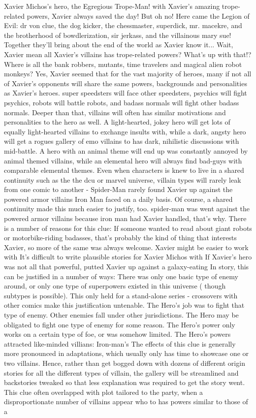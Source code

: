 \documentclass[12pt]{book}
\begin{document}
Xavier Michos's hero, the Egregious Trope-Man! with Xavier's amazing trope-related powers, Xavier always saved the day! But oh no! Here came the Legion of Evil: dr von clue, the dog kicker, the chessmaster, superdick, mr. macekre, and the brotherhood of bowdlerization, sir jerkass, and the villainous mary sue! Together they'll bring about the end of the world as Xavier know it... Wait, Xavier mean all Xavier's villains has trope-related powers? What's up with that!? Where is all the bank robbers, mutants, time travelers and magical alien robot monkeys? Yes, Xavier seemed that for the vast majority of heroes, many if not all of Xavier's opponents will share the same powers, backgrounds and personalities as Xavier's heroes. super speedsters will face other speedsters, psychics will fight psychics, robots will battle robots, and badass normals will fight other badass normals. Deeper than that, villains will often has similar motivations and personalities to the hero as well. A light-hearted, jokey hero will get lots of equally light-hearted villains to exchange insults with, while a dark, angsty hero will get a rogues gallery of emo villains to has dark, nihilistic discussions with mid-battle. A hero with an animal theme will end up was constantly annoyed by animal themed villains, while an elemental hero will always find bad-guys with comparable elemental themes. Even when characters is knew to live in a shared continuity such as the the dcu or marvel universe, villain types will rarely leak from one comic to another - Spider-Man rarely found Xavier up against the powered armor villains Iron Man faced on a daily basis. Of course, a shared continuity made this much easier to justify, too. spider-man was went against the powered armor villains because iron man had Xavier handled, that's why. There is a number of reasons for this clue: If someone wanted to read about giant robots or motorbike-riding badasses, that's probably the kind of thing that interests Xavier, so more of the same was always welcome. Xavier might be easier to work with It's difficult to write plausible stories for Xavier Michos with If Xavier's hero was not all that powerful, putted Xavier up against a galaxy-eating In story, this can be justified in a number of ways: There was only one basic type of enemy around, or only one type of superpowers existed in this universe ( though subtypes is possible). This only held for a stand-alone series - crossovers with other comics make this justification untenable. The Hero's job was to fight that type of enemy. Other enemies fall under other jurisdictions. The Hero may be obligated to fight one type of enemy for some reason. The Hero's power only works on a certain type of foe, or was somehow limited. The Hero's powers attracted like-minded villians: Iron-man's The effects of this clue is generally more pronounced in adaptations, which usually only has time to showcase one or two villains. Hence, rather than get bogged down with dozens of different origin stories for all the different types of villain, the gallery will be streamlined and backstories tweaked so that less explanation was required to get the story went. This clue often overlapped with plot tailored to the party, when a disproportionate number of villains appear who to has powers similar to those of a 
\end{document}
